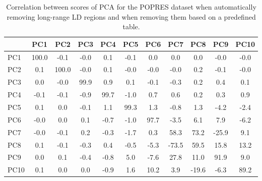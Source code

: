 \documentclass{bioinfo}
\begin{document}
\begin{table}[!tpb]
\centering
\begin{tabular}{l|cccccccccc}
  \hline
 & PC1 & PC2 & PC3 & PC4 & PC5 & PC6 & PC7 & PC8 & PC9 & PC10 \\
  \hline
PC1 & 100.0 & -0.1 & -0.0 & 0.1 & -0.1 & 0.0 & 0.0 & 0.0 & -0.0 & -0.0 \\
  PC2 & 0.1 & 100.0 & -0.0 & 0.1 & -0.0 & -0.0 & -0.0 & 0.2 & -0.1 & -0.0 \\
  PC3 & 0.0 & -0.0 & 99.9 & 0.9 & 0.1 & -0.1 & -0.3 & 0.2 & 0.4 & 0.1 \\
  PC4 & -0.1 & -0.1 & -0.9 & 99.7 & -1.0 & 0.7 & 0.6 & 0.2 & 0.3 & 0.9 \\
  PC5 & 0.1 & 0.0 & -0.1 & 1.1 & 99.3 & 1.3 & -0.8 & 1.3 & -4.2 & -2.4 \\
  PC6 & -0.0 & 0.0 & 0.1 & -0.7 & -1.0 & 97.7 & -3.5 & 6.1 & 7.9 & -6.2 \\
  PC7 & -0.0 & -0.1 & 0.2 & -0.3 & -1.7 & 0.3 & 58.3 & 73.2 & -25.9 & 9.1 \\
  PC8 & 0.1 & -0.1 & -0.3 & 0.4 & -0.5 & -5.3 & -73.5 & 59.5 & 15.8 & 13.2 \\
  PC9 & 0.0 & 0.1 & -0.4 & -0.8 & 5.0 & -7.6 & 27.8 & 11.0 & 91.9 & 9.0 \\
  PC10 & 0.1 & 0.0 & 0.0 & -0.9 & 1.6 & 10.2 & 3.9 & -19.6 & -6.3 & 89.2 \\
   \hline
\end{tabular}
\caption{Correlation between scores of PCA for the POPRES dataset  when automatically removing long-range LD regions and when removing them based on a predefined table.}
\label{tab:pc-popres}
\end{table}
\end{document}
